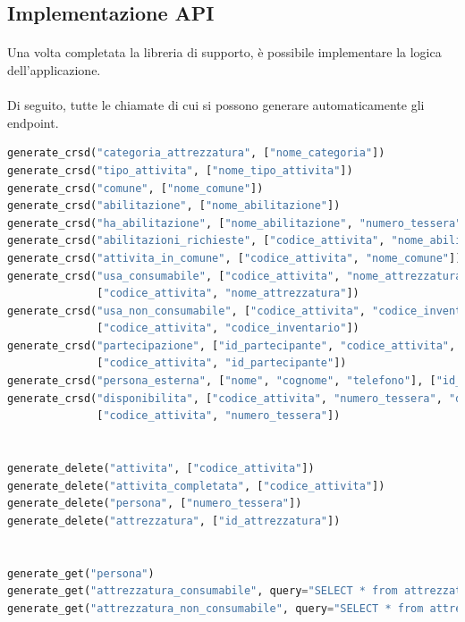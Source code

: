 \documentclass[11pt,a4paper,english]{article}
\begin{document}
\subsection{Implementazione API}

\paragraph{} Una volta completata la libreria di supporto, è possibile implementare la logica dell'applicazione. 

\paragraph{} Di seguito, tutte le chiamate di cui si possono generare automaticamente gli endpoint.

\begin{lstlisting}[language=python, caption=Endpoint generati automaticamente]
generate_crsd("categoria_attrezzatura", ["nome_categoria"])
generate_crsd("tipo_attivita", ["nome_tipo_attivita"])
generate_crsd("comune", ["nome_comune"])
generate_crsd("abilitazione", ["nome_abilitazione"])
generate_crsd("ha_abilitazione", ["nome_abilitazione", "numero_tessera"])
generate_crsd("abilitazioni_richieste", ["codice_attivita", "nome_abilitazione"])
generate_crsd("attivita_in_comune", ["codice_attivita", "nome_comune"])
generate_crsd("usa_consumabile", ["codice_attivita", "nome_attrezzatura", "quantita_utilizzata"],
              ["codice_attivita", "nome_attrezzatura"])
generate_crsd("usa_non_consumabile", ["codice_attivita", "codice_inventario", "rientrato", "stato_attuale_attrezzatura"],
              ["codice_attivita", "codice_inventario"])
generate_crsd("partecipazione", ["id_partecipante", "codice_attivita", "squadra", "timestamp_ingresso", "timestamp_uscita"],
              ["codice_attivita", "id_partecipante"])
generate_crsd("persona_esterna", ["nome", "cognome", "telefono"], ["id_partecipante"], returning="idPartecipante")
generate_crsd("disponibilita", ["codice_attivita", "numero_tessera", "disponibilita_positiva"],
              ["codice_attivita", "numero_tessera"])


generate_delete("attivita", ["codice_attivita"])
generate_delete("attivita_completata", ["codice_attivita"])
generate_delete("persona", ["numero_tessera"])
generate_delete("attrezzatura", ["id_attrezzatura"])


generate_get("persona")
generate_get("attrezzatura_consumabile", query="SELECT * from attrezzatura natural join attrezzatura_consumabile")
generate_get("attrezzatura_non_consumabile", query="SELECT * from attrezzatura natural join attrezzatura_non_consumabile")
\end{lstlisting}
\end{document}
